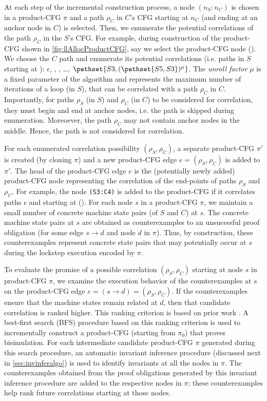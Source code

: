 At each step of the incremental construction process, a node $(n_S\!:\!n_C)$ is chosen in a product-CFG $\pi$
and a path $\rho_C$ in $C$'s CFG starting at $n_C$ (and ending at an anchor node in $C$) is selected.
Then, we enumerate the potential correlations of the path $\rho_C$ in the $S$'s CFG.
For example, during construction of the product-CFG shown in \cref{fig:llAllocProductCFG},
say we select the product-CFG node ().
We choose the $C$ path  and enumerate its potential correlations (i.e. paths in $S$ starting at ):
$\epsilon$, , , \ldots, $\pathset{S3,(\pathset{S5,S3})^\mu}$.
The {\em unroll factor} $\mu$ is a fixed parameter of the algorithm and represents the maximum number of iterations of a loop (in $S$),
that can be correlated with a path $\rho_C$ in $C$.
Importantly, for paths $\rho_S$ (in $S$) and $\rho_C$ (in $C$) to be considered for correlation,
they must begin and end at anchor nodes, i.e. the path  is skipped during enumeration.
Moreoever, the path $\rho_C$ may not contain anchor nodes in the middle.
Hence, the path  is not considered for correlation.

For each enumerated correlation possibility $(\rho_S,\rho_C)$, a separate product-CFG $\pi'$ is
created (by cloning $\pi$) and a new product-CFG edge $e=(\rho_S,\rho_C)$ is added to $\pi'$.
The head of the product-CFG edge $e$ is the (potentially newly added) product-CFG node representing
the correlation of the end-points of paths $\rho_S$ and $\rho_C$. For example, the node {\tt (S3:C4)} is added
to the product-CFG if it correlates paths $\epsilon$ and  starting at ().
For each node $s$ in a product-CFG $\pi$, we maintain a small number of
concrete machine state pairs (of $S$ and $C$) at $s$.
The concrete machine state pairs at $s$ are obtained as counterexamples to an unsucessful proof
obligation  (for some edge $s \rightarrow d$ and node $d$ in $\pi$).
Thus, by construction, these counterexamples represent concrete state pairs that may potentially occur
at $s$ during the lockstep execution encoded by $\pi$.

To evaluate the promise of a possible correlation $(\rho_S,\rho_C)$ starting at node $s$
in product-CFG $\pi$, we examine the execution behavior of the counterexamples at $s$ on
the product-CFG edge $e=(s\rightarrow d)=(\rho_S,\rho_C)$.
If the counterexamples ensure that the machine states remain related at $d$,
then that candidate correlation is ranked higher.
This ranking criterion is based on prior work \cite{oopsla20}.
A best-first search (BFS) procedure based on this ranking criterion is used to incrementally construct
a product-CFG (starting from $\pi_0$) that proves bisimulation.
For each intermediate candidate product-CFG $\pi$ generated during this search procedure,
an automatic invariant inference procedure (discussed next in \cref{sec:invinferalgo}) is
used to identify invariants at all the nodes in $\pi$.
The counterexamples obtained from the proof obligations generated by this invariant inference
procedure are added to the respective nodes in $\pi$; these counterexamples help rank
future correlations starting at those nodes.

